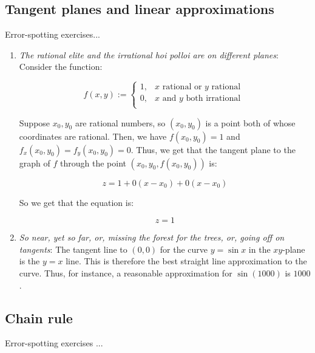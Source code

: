 \documentclass[10pt]{amsart}
\begin{document}
\subsection{Tangent planes and linear approximations}

Error-spotting exercises...

\begin{enumerate}

\item {\em The rational elite and the irrational hoi polloi are on
  different planes}: Consider the function:

  $$f(x,y) := \left\lbrace \begin{array}{rl} 1, & x \text{ rational  or } y \text { rational }\\0, & x \text{ and } y \text{ both irrational } \\\end{array}\right.$$

  Suppose $x_0,y_0$ are rational numbers, so $(x_0,y_0)$ is a point
  both of whose coordinates are rational. Then, we have $f(x_0,y_0) =
  1$ and $f_x(x_0,y_0) = f_y(x_0,y_0) = 0$. Thus, we get that the
  tangent plane to the graph of $f$ through the point
  $(x_0,y_0,f(x_0,y_0))$ is:

  $$z = 1 + 0(x - x_0) + 0(x - x_0)$$

  So we get that the equation is:

  $$z = 1$$

\item {\em So near, yet so far, or, missing the forest for the trees,
  or, going off on tangents}: The tangent line to $(0,0)$ for the
  curve $y = \sin x$ in the $xy$-plane is the $y = x$ line. This is
  therefore the best straight line approximation to the curve. Thus,
  for instance, a reasonable approximation for $\sin(1000)$ is $1000$.
\end{enumerate}

\subsection{Chain rule}

Error-spotting exercises ...
\end{document}
